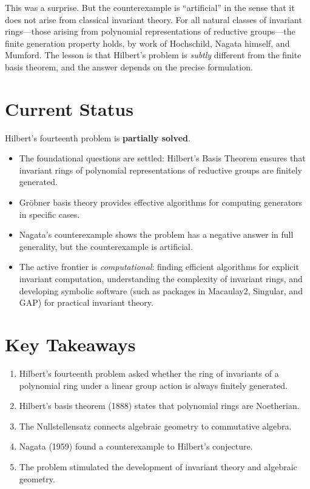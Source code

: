 This was a surprise. But the counterexample is ``artificial'' in the sense that it does not arise from classical invariant theory. For all natural classes of invariant rings---those arising from polynomial representations of reductive groups---the finite generation property holds, by work of Hochschild, Nagata himself, and Mumford. The lesson is that Hilbert's problem is \emph{subtly} different from the finite basis theorem, and the answer depends on the precise formulation.

\section{Current Status}

\begin{partiallybox}
Hilbert's fourteenth problem is \textbf{partially solved}.

\begin{itemize}
    \item The foundational questions are settled: Hilbert's Basis Theorem ensures that invariant rings of polynomial representations of reductive groups are finitely generated.
    \item Gr\"obner basis theory provides effective algorithms for computing generators in specific cases.
    \item Nagata's counterexample shows the problem has a negative answer in full generality, but the counterexample is artificial.
    \item The active frontier is \emph{computational}: finding efficient algorithms for explicit invariant computation, understanding the complexity of invariant rings, and developing symbolic software (such as packages in Macaulay2, Singular, and GAP) for practical invariant theory.
\end{itemize}
\end{partiallybox}

\section*{Key Takeaways}

\begin{enumerate}
    \item Hilbert's fourteenth problem asked whether the ring of invariants of a polynomial ring under a linear group action is always finitely generated.
    \item Hilbert's basis theorem (1888) states that polynomial rings are Noetherian.
    \item The Nullstellensatz connects algebraic geometry to commutative algebra.
    \item Nagata (1959) found a counterexample to Hilbert's conjecture.
    \item The problem stimulated the development of invariant theory and algebraic geometry.
\end{enumerate}

